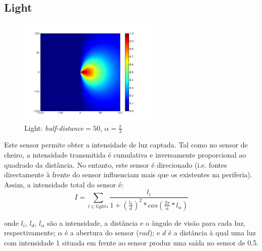 \documentclass[a4paper]{article}
\begin{document}
\subsection{Light}
\begin{figure}[h]
	\vspace{-20pt}
	\begin{center}
		\includegraphics[width=0.6\textwidth]{graphs/sensors/light.png}
	\end{center}
	\vspace{-20pt}
	\caption{Light: \emph{half-distance}$=50$, $\alpha=\frac{\pi}{2}$}
\end{figure}

\indent Este sensor permite obter a intensidade de luz captada. Tal como no sensor de cheiro, a intensidade transmitida
é cumulativa e inversamente proporcional ao quadrado da distância. No entanto, este sensor é direcionado (i.e. fontes
directamente à frente do sensor influenciam mais que os existentes na periferia). Assim, a intensidade total do sensor é:
\[
	I = \displaystyle\sum\limits_{l \in lights} \frac{l_{i}}{1 + (\frac{l_{d}}{d})^{2}*cos(\frac{2\pi}{\alpha}*l_{\alpha})}
\]

onde $l_{i}$, $l_{d}$, $l_{\alpha}$ são a intensidade, a distância e o ângulo de visão para cada luz, respectivamente;
$\alpha$ é a abertura do sensor ($rad$);
e $d$ é a distância à qual uma luz com intensidade 1 situada em frente ao sensor produz uma saída no sensor de 0.5.

\cleardoublepage
\end{document}
